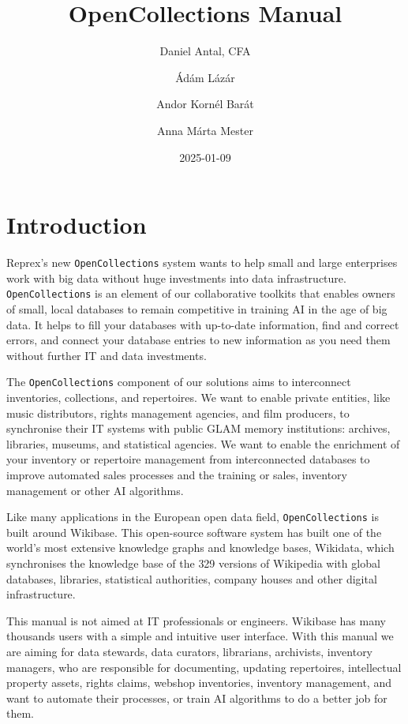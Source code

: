 \documentclass[
  letterpaper,
  DIV=11,
  numbers=noendperiod]{scrreprt}
\title{OpenCollections Manual}
\author{Daniel Antal, CFA \and Ádám Lázár \and Andor Kornél
Barát \and Anna Márta Mester}
\date{2025-01-09}
\renewcommand*\contentsname{Table of contents}
\newcommand\contentsname{Table of contents}
\begin{document}
\maketitle

\renewcommand*\contentsname{Table of contents}
{
\hypersetup{linkcolor=}
\setcounter{tocdepth}{2}
\tableofcontents
}


\chapter*{Introduction}\label{introduction}


Reprex's new \texttt{OpenCollections} system wants to help small and
large enterprises work with big data without huge investments into data
infrastructure. \texttt{OpenCollections} is an element of our
collaborative toolkits that enables owners of small, local databases to
remain competitive in training AI in the age of big data. It helps to
fill your databases with up-to-date information, find and correct
errors, and connect your database entries to new information as you need
them without further IT and data investments.

The \texttt{OpenCollections} component of our solutions aims to
interconnect inventories, collections, and repertoires. We want to
enable private entities, like music distributors, rights management
agencies, and film producers, to synchronise their IT systems with
public GLAM memory institutions: archives, libraries, museums, and
statistical agencies. We want to enable the enrichment of your inventory
or repertoire management from interconnected databases to improve
automated sales processes and the training or sales, inventory
management or other AI algorithms.

Like many applications in the European open data field,
\texttt{OpenCollections} is built around Wikibase. This open-source
software system has built one of the world's most extensive knowledge
graphs and knowledge bases, Wikidata, which synchronises the knowledge
base of the 329 versions of Wikipedia with global databases, libraries,
statistical authorities, company houses and other digital
infrastructure.

This manual is not aimed at IT professionals or engineers. Wikibase has
many thousands users with a simple and intuitive user interface. With
this manual we are aiming for data stewards, data curators, librarians,
archivists, inventory managers, who are responsible for documenting,
updating repertoires, intellectual property assets, rights claims,
webshop inventories, inventory management, and want to automate their
processes, or train AI algorithms to do a better job for them.
\end{document}
